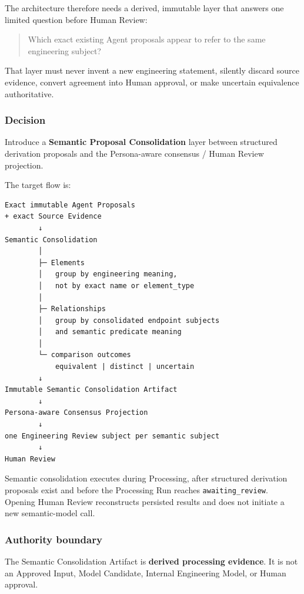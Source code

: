 The architecture therefore needs a derived, immutable layer that answers one limited question before Human Review:

\begin{quote}
Which exact existing Agent proposals appear to refer to the same engineering subject?
\end{quote}

That layer must never invent a new engineering statement, silently discard source evidence, convert agreement into Human approval, or make uncertain equivalence authoritative.

\hypertarget{decision-10}{%
\subsubsection{Decision}\label{decision-10}}

Introduce a \textbf{Semantic Proposal Consolidation} layer between structured derivation proposals and the Persona-aware consensus / Human Review projection.

The target flow is:

\begin{verbatim}
Exact immutable Agent Proposals
+ exact Source Evidence
        ↓
Semantic Consolidation
        │
        ├─ Elements
        │   group by engineering meaning,
        │   not by exact name or element_type
        │
        ├─ Relationships
        │   group by consolidated endpoint subjects
        │   and semantic predicate meaning
        │
        └─ comparison outcomes
            equivalent | distinct | uncertain
        ↓
Immutable Semantic Consolidation Artifact
        ↓
Persona-aware Consensus Projection
        ↓
one Engineering Review subject per semantic subject
        ↓
Human Review
\end{verbatim}

Semantic consolidation executes during Processing, after structured derivation proposals exist and before the Processing Run reaches \texttt{awaiting\_review}. Opening Human Review reconstructs persisted results and does not initiate a new semantic-model call.

\hypertarget{authority-boundary}{%
\subsubsection{Authority boundary}\label{authority-boundary}}

The Semantic Consolidation Artifact is \textbf{derived processing evidence}. It is not an Approved Input, Model Candidate, Internal Engineering Model, or Human approval.

